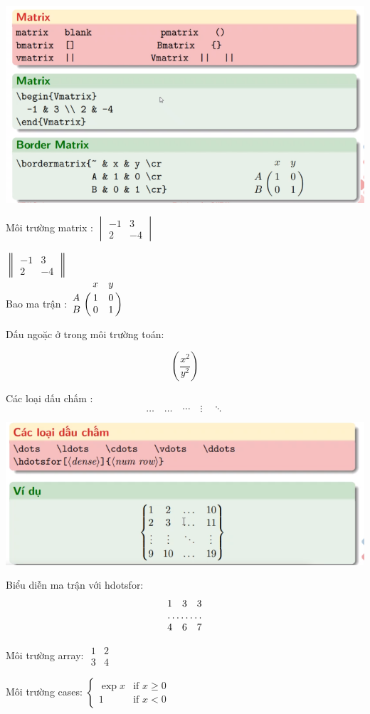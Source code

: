 \documentclass{article}
\begin{document}
\includegraphics[scale=0.6]{image/matrix.png}

Môi trường matrix :
$\begin{vmatrix}
	-1 & 3\\2 & -4
\end{vmatrix}$

$\begin{Vmatrix}
	-1 & 3\\
	2 & -4
\end{Vmatrix}$\\

Bao ma trận :
$
\bordermatrix{~ & x & y \cr
A & 1 & 0 \cr
B & 0 & 1 \cr}
$

Dấu ngoặc ở trong môi trường toán:

$$\left( \frac{x^2}{y^2} \right) 
$$

Các loại dấu chấm :
$$\dots \quad  \ldots \quad  \cdots \quad  \vdots \quad  \ddots$$

\includegraphics[scale=0.6]{image/dot.png}

Biểu diễn ma trận  với hdotsfor:
$$
\begin{matrix}
	1&3&3\\
	\hdotsfor[]{3}\\
	4&6&7
\end{matrix}
$$

Môi trường array:
$\begin{array}{c|c}
	1 & 2 \\ \hline
	3 & 4
\end{array}$

Môi trường cases:
$\begin{cases}
	\exp{x} & \text{if } x \geq 0 \\
	1 & \text{if } x < 0
\end{cases}$
\end{document}
